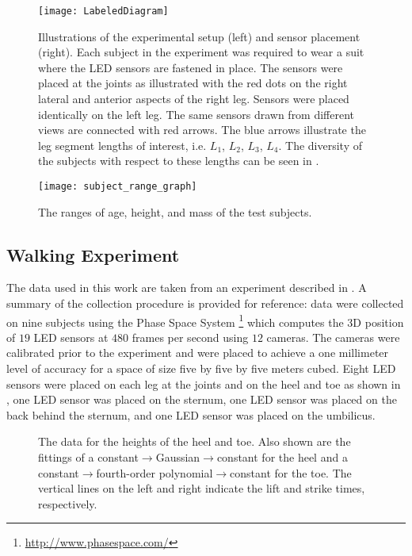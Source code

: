 \begin{figure}[t!]
  \centering
  \texttt{[image: LabeledDiagram]}
  \caption[Illustrations of the experimental setup and sensor
  placement.]{Illustrations of the experimental setup (left) and sensor
    placement (right).
    Each subject in the experiment was required to wear a suit where the LED
    sensors are fastened in place.
    The sensors were placed at the joints as illustrated with the red dots on
    the right lateral and anterior aspects of the right leg.
    Sensors were placed identically on the left leg.
    The same sensors drawn from different views are connected with red arrows.
    The blue arrows illustrate the leg segment lengths of interest,
    i.e. $L_{1}$, $L_{2}$, $L_{3}$, $L_{4}$.
    The diversity of the subjects with respect to these lengths can be seen in
    .}
  \label{fig:Sensors}
\end{figure}



\begin{figure}[t!]
  \centering
  \texttt{[image: subject\_range\_graph]}
  \caption{The ranges of age, height, and mass of the test subjects.}
  \label{fig:subject-ranges}
\end{figure}

\subsection{Walking Experiment}

The data used in this work are taken from an experiment described in
\cite{Ames2011a}.
%
A summary of the collection procedure is provided for reference:
%
data were collected on nine subjects using the Phase Space System%
%
\footnote{\url{http://www.phasespace.com/}}\xspace
%
which computes the 3D position of $19$ LED sensors at $480$ frames per second
using $12$ cameras.
%
The cameras were calibrated prior to the experiment and were placed to achieve a
one millimeter level of accuracy for a space of size five by five by five meters
cubed.
%
Eight LED sensors were placed on each leg at the joints and on the heel and toe
as shown in , one LED sensor was placed on the sternum, one
LED sensor was placed on the back behind the sternum, and one LED sensor was
placed on the umbilicus.

\begin{figure}[t!]
  \centering
  \caption[The data for the heights of the heel and toe.]{The data for the
    heights of the heel and toe.
    Also shown are the fittings of a constant$\to$Gaussian$\to$constant for the
    heel and a constant$\to$fourth-order polynomial$\to$constant for the toe.
    The vertical lines on the left and right indicate the lift and strike times,
    respectively.}
  \label{fig:heeltoefit}
\end{figure}

